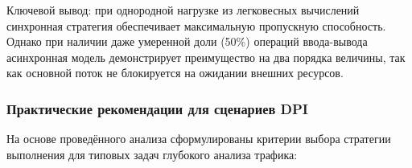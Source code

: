 Ключевой вывод: при однородной нагрузке из легковесных вычислений синхронная стратегия обеспечивает максимальную пропускную способность. Однако при наличии даже умеренной доли (50\%) операций ввода-вывода асинхронная модель демонстрирует преимущество на два порядка величины, так как основной поток не блокируется на ожидании внешних ресурсов.
%
%
%
%
%

\subsubsection{Практические рекомендации для сценариев DPI}

На основе проведённого анализа сформулированы критерии выбора стратегии выполнения для типовых задач глубокого анализа трафика:

